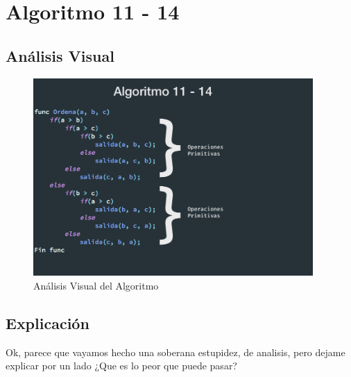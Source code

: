 \documentclass[12pt, fleqn]{article}                            %
\theoremstyle{break}                                            %
\begin{document}
\clearpage
\section{Algoritmo 11 - 14}


    \subsection{Análisis Visual}

        \begin{figure}[h]
            \centering
            \includegraphics[width=0.95\textwidth]{Algoritmo11}
            \caption{Análisis Visual del Algoritmo}
        \end{figure}

    \vspace{1em}
    \subsection{Explicación}

        Ok, parece que vayamos hecho una soberana estupidez, de analisis, pero dejame explicar
        por un lado ¿Que es lo peor que puede pasar?
\end{document}
